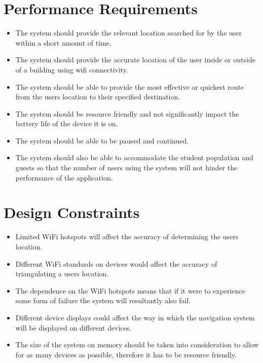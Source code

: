\documentclass{article}
\begin{document}
	\section{Performance Requirements}\label{sec:performance-requirements}
		\begin{itemize}
		\small
		\item The system should provide the relevant location searched for by the user within a short amount of time.
		\item The system should provide the accurate location of the user inside or outside of a building using wifi connectivity.
		\item The system should be able to provide the most effective or quickest route from the users location to their specified destination.
		\item The system should be resource friendly and not significantly impact the battery life of the device it is on.
		\item The system should be able to be paused and continued.
		\item The system should also be able to accommodate the student population and guests so that the number of users using the system will not hinder the performance of the application.
		\end{itemize}
		
		
	\clearpage

	\section{Design Constraints}\label{sec:design-constraints}
		\begin{itemize}
		\small
		\item Limited WiFi hotspots will affect the accuracy of determining the users location.
		\item Different WiFi standards on devices would affect the accuracy of triangulating a users location.
		\item The dependence on the WiFi hotspots means that if it were to experience some form of failure the system will resultantly also fail.
		\item Different device displays could affect the way in which the navigation system will be displayed on different devices.
		\item The size of the system on memory should be taken into consideration to allow for as many devices as possible, therefore it has to be resource friendly.
		\end{itemize}
		
\end{document}
